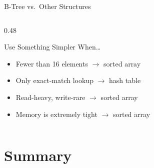\documentclass[aspectratio=169, 10pt]{beamer}
\begin{document}
\begin{frame}{B-Tree vs.\ Other Structures}
\begin{columns}[T]
\begin{column}{0.48\textwidth}
\begin{block}{Use Something Simpler When\ldots}
\begin{itemize}
  \item Fewer than 16 elements $\rightarrow$ sorted array
  \item Only exact-match lookup $\rightarrow$ hash table
  \item Read-heavy, write-rare $\rightarrow$ sorted array
  \item Memory is extremely tight $\rightarrow$ sorted array
\end{itemize}
\end{block}
\end{column}
\end{columns}
\end{frame}

\section{Summary}
\end{document}
